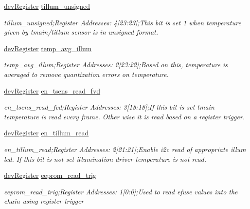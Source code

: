 \begin{DoxyCompactItemize}
\mbox{\hyperlink{classdev_register}{dev\+Register}} \mbox{\hyperlink{class_o_p_t3101_registers_a495c76417c7131c177fec04362eaacfe}{tillum\+\_\+unsigned}}
\begin{DoxyCompactList}\small\item\em tillum\+\_\+unsigned;Register Addresses\+: 4\mbox{[}23\+:23\mbox{]};This bit is set \textquotesingle{}1\textquotesingle{} when temperature given by tmain/tillum sensor is in unsigned format. \end{DoxyCompactList}\item 
\mbox{\hyperlink{classdev_register}{dev\+Register}} \mbox{\hyperlink{class_o_p_t3101_registers_aa1c31f802608991cabed55f07ad70837}{temp\+\_\+avg\+\_\+illum}}
\begin{DoxyCompactList}\small\item\em temp\+\_\+avg\+\_\+illum;Register Addresses\+: 2\mbox{[}23\+:22\mbox{]};Based on this, temperature is averaged to remove quantization errors on temperature. \end{DoxyCompactList}\item 
\mbox{\hyperlink{classdev_register}{dev\+Register}} \mbox{\hyperlink{class_o_p_t3101_registers_aaab7fe3c1c08bac11e1a6c640105ef59}{en\+\_\+tsens\+\_\+read\+\_\+fvd}}
\begin{DoxyCompactList}\small\item\em en\+\_\+tsens\+\_\+read\+\_\+fvd;Register Addresses\+: 3\mbox{[}18\+:18\mbox{]};If this bit is set tmain temperature is read every frame. Other wise it is read based on a register trigger. \end{DoxyCompactList}\item 
\mbox{\hyperlink{classdev_register}{dev\+Register}} \mbox{\hyperlink{class_o_p_t3101_registers_a10a311b8708c5d99715e63ff83ac8fa9}{en\+\_\+tillum\+\_\+read}}
\begin{DoxyCompactList}\small\item\em en\+\_\+tillum\+\_\+read;Register Addresses\+: 2\mbox{[}21\+:21\mbox{]};Enable i2c read of appropriate illum led. If this bit is not set illumination driver temperature is not read. \end{DoxyCompactList}\item 
\mbox{\hyperlink{classdev_register}{dev\+Register}} \mbox{\hyperlink{class_o_p_t3101_registers_a072337c0bda7e96a2e7671c24b9d2ea0}{eeprom\+\_\+read\+\_\+trig}}
\begin{DoxyCompactList}\small\item\em eeprom\+\_\+read\+\_\+trig;Register Addresses\+: 1\mbox{[}0\+:0\mbox{]};Used to read efuse values into the chain using register trigger \end{DoxyCompactList}\item 

\end{DoxyCompactItemize}
